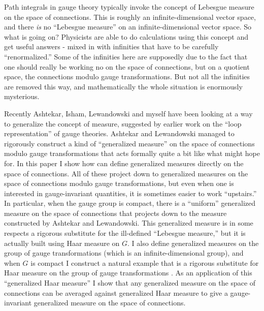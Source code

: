 \documentclass{article}
\def\tightlist{}
\renewcommand{\texttt}[1]{%
  \begingroup
  \ttfamily
  \begingroup\lccode`~=`/\lowercase{\endgroup\def~}{/\discretionary{}{}{}}%
  \begingroup\lccode`~=`[\lowercase{\endgroup\def~}{[\discretionary{}{}{}}%
  \begingroup\lccode`~=`.\lowercase{\endgroup\def~}{.\discretionary{}{}{}}%
  \catcode`/=\active\catcode`[=\active\catcode`.=\active
  \scantokens{#1\noexpand}%
  \endgroup
}
\begin{document}

Path integrals in gauge theory typically invoke the concept of Lebesgue
measure on the space of connections. This is roughly an
infinite-dimensional vector space, and there \emph{is} no ``Lebesgue
measure'' on an infinite-dimensional vector space. So what is going on?
Physicists are able to do calculations using this concept and get useful
answers - mixed in with infinities that have to be carefully
``renormalized.'' Some of the infinities here are supposedly due to the
fact that one should really be working no on the space of connections,
but on a quotient space, the connections modulo gauge transformations.
But not all the infinities are removed this way, and mathematically the
whole situation is enormously mysterious.

Recently Ashtekar, Isham, Lewandowski and myself have been looking at a
way to generalize the concept of measure, suggested by earlier work on
the ``loop representation'' of gauge theories. Ashtekar and Lewandowski
managed to rigorously construct a kind of ``generalized measure'' on the
space of connections modulo gauge transformations that acts formally
quite a bit like what might hope for. In this paper I show how can
define generalized measures directly on the space of connections. All of
these project down to generalized measures on the space of connections
modulo gauge transformations, but even when one is interested in
gauge-invariant quantities, it is sometimes easier to work ``upstairs.''
In particular, when the gauge group is compact, there is a ``uniform''
generalized measure on the space of connections that projects down to
the measure constructed by Ashtekar and Lewandowski. This generalized
measure is in some respects a rigorous substitute for the ill-defined
``Lebesgue measure,'' but it is actually built using Haar measure on
\(G\). I also define generalized measures on the group of gauge
transformations (which is an infinite-dimensional group), and when \(G\)
is compact I construct a natural example that is a rigorous substitute
for Haar measure on the group of gauge transformations . As an
application of this ``generalized Haar measure'' I show that any
generalized measure on the space of connections can be averaged against
generalized Haar measure to give a gauge-invariant generalized measure
on the space of connections.
\end{document}
